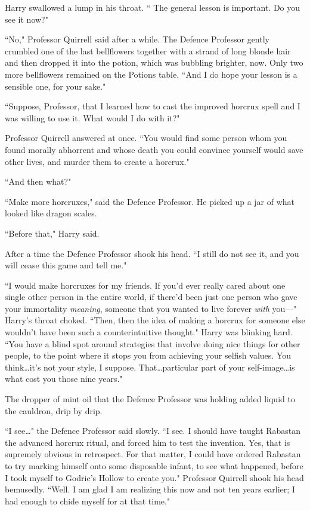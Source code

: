 Harry swallowed a lump in his throat. `` The general lesson is important. Do you see it now?"

``No," Professor Quirrell said after a while. The Defence Professor gently crumbled one of the last bellflowers together with a strand of long blonde hair and then dropped it into the potion, which was bubbling brighter, now. Only two more bellflowers remained on the Potions table. ``And I do hope your lesson is a sensible one, for your sake."

``Suppose, Professor, that I learned how to cast the improved horcrux spell and I was willing to use it. What would I do with it?"

Professor Quirrell answered at once. ``You would find some person whom you found morally abhorrent and whose death you could convince yourself would save other lives, and murder them to create a horcrux."

``And then what?"

``Make more horcruxes," said the Defence Professor. He picked up a jar of what looked like dragon scales.

``Before that," Harry said.

After a time the Defence Professor shook his head. ``I still do not see it, and you will cease this game and tell me."

``I would make horcruxes for my friends. If you'd ever really cared about one single other person in the entire world, if there'd been just one person who gave your immortality \emph{meaning}, someone that you wanted to live forever \emph{with} you—" Harry's throat choked. ``Then, then the idea of making a horcrux for someone else wouldn't have been such a counterintuitive thought." Harry was blinking hard. ``You have a blind spot around strategies that involve doing nice things for other people, to the point where it stops you from achieving your selfish values. You think…it's not your style, I suppose. That…particular part of your self-image…is what cost you those nine years."

The dropper of mint oil that the Defence Professor was holding added liquid to the cauldron, drip by drip.

``I see…" the Defence Professor said slowly. ``I see. I should have taught Rabastan the advanced horcrux ritual, and forced him to test the invention. Yes, that is supremely obvious in retrospect. For that matter, I could have ordered Rabastan to try marking himself onto some disposable infant, to see what happened, before I took myself to Godric's Hollow to create you." Professor Quirrell shook his head bemusedly. ``Well. I am glad I am realizing this now and not ten years earlier; I had enough to chide myself for at that time."

